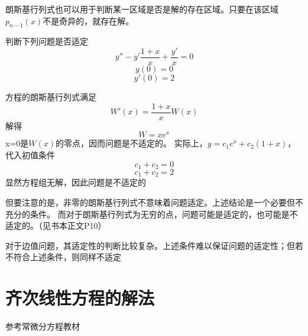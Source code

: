 朗斯基行列式也可以用于判断某一区域是否是解的存在区域。只要在该区域$p_{n-1}(x)$不是奇异的，就存在解。

\begin{example}
    判断下列问题是否适定
    \[y''-y'\frac{1+x}{x}+\frac{y'}{x}=0\]
    \[y(0)=0\]\[y'(0)=2\]

方程的朗斯基行列式满足
    \[W'(x)=\frac{1+x}{x}W(x)\]
    解得\[W=xe^x\]
    x=0是$W(x)$的零点，因而问题是不适定的。
    实际上，$y=c_1e^x+c_2(1+x)$，代入初值条件
    \[c_1+c_2=0\]
    \[c_1+c_2=2\]
    显然方程组无解，因此问题是不适定的
\end{example}

但要注意的是，非零的朗斯基行列式不意味着问题适定。上述结论是一个必要但不充分的条件。
而对于朗斯基行列式为无穷的点，问题可能是适定的，也可能是不适定的。（见书本正文P10）


对于边值问题，其适定性的判断比较复杂。上述条件难以保证问题的适定性；但若不符合上述条件，则同样不适定

\section{齐次线性方程的解法}
参考常微分方程教材




